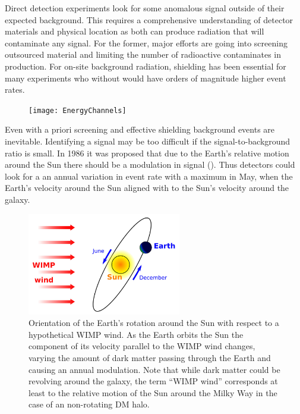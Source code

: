  Direct detection experiments look for some anomalous signal outside of their expected background.  This requires a comprehensive
 understanding of detector materials and physical location as both can produce radiation that will contaminate any signal.  For the
 former, major efforts are going into screening outsourced material and limiting the number of radioactive contaminates in
 production.  For on-site background radiation, shielding has been essential for many experiments who without would have orders
 of magnitude higher event rates.
 
\begin{figure}
\centering
\texttt{[image: EnergyChannels]}
\label{fig:energy_channels}
\end{figure}
 
 Even with a priori screening and effective shielding background events are inevitable.  Identifying a signal may be too
 difficult if the signal-to-background ratio is small.  In 1986 it was proposed
 that due to the Earth's relative motion around the Sun there should be a modulation in signal ().  Thus
 detectors could look for a an annual variation in event rate with a maximum in May, when the Earth's velocity around the
 Sun aligned with to the Sun's velocity around the galaxy.

\begin{figure}
\includegraphics[width=0.6\textwidth]{wimp_wind}
\caption{Orientation of the Earth's rotation around the Sun with respect to a hypothetical WIMP wind.  As the Earth orbits the Sun
the component of its velocity parallel to the WIMP wind changes, varying the amount of dark matter passing through the Earth and
causing an annual modulation.  Note that while dark matter could be revolving around the galaxy, the term ``WIMP wind'' corresponds at
least to the relative motion of the Sun around the Milky Way in the case of an non-rotating DM halo.}
\label{fig:direct_detect_modulation}
\end{figure}


